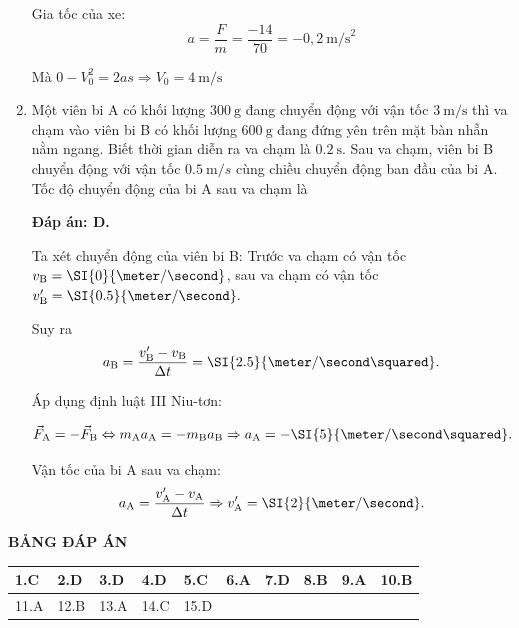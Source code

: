 \begin{enumerate}[label=\bfseries Câu \arabic*:]
{		Gia tốc của xe:
		\[a=\dfrac{F}{m}=\dfrac{-14}{70} = -0,2\ \text{m/s}^2\]
		
		Mà $0-V_0^2 = 2as \Rightarrow V_0 = 4\ \text{m/s}$
	}
	\item {}
	
	
	{Một viên bi A có khối lượng $\SI{300}{\gram}$ đang chuyển động với vận tốc $\SI{3}{\meter / \second}$ thì va chạm vào viên bi B có khối lượng $\SI{600}{\gram}$ đang đứng yên trên mặt bàn nhẵn nằm ngang. Biết thời gian diễn ra va chạm là $\SI{0.2}{\second}$. Sau va chạm, viên bi B chuyển động với vận tốc $\SI{0.5}{\meter/s}$ cùng chiều chuyển động ban đầu của bi A. Tốc độ chuyển động của bi A sau va chạm là
	}
	
	\hideall
	{	\textbf{Đáp án: D.}
		
		Ta xét chuyển động của viên bi B: Trước va chạm có vận tốc
		 $v_\text B = \SI{0}{\meter / \second}$, sau va chạm có vận tốc $v_\text B'=\SI{0.5}{\meter/ \second}.$
		
		Suy ra $$a_\text B=\dfrac{v_\text B'-v_\text B}{\Delta t}=\SI{2.5}{\meter / \second \squared}.$$
		
		Áp dụng định luật III Niu-tơn:
		
		$$\vec{F}_\text {A}=- \vec{F}_\text {B} \Leftrightarrow m_\text A a_\text A =- m_\text B a_\text B \Rightarrow a_\text A =- \SI{5}{\meter / \second \squared}.$$
		
		Vận tốc của bi A sau va chạm: $$a_\text A = \dfrac{v_\text A'-v_\text A}{\Delta t}\Rightarrow v_\text A' = \SI{2}{\meter / \second}.$$
	}
	
\end{enumerate}



\hideall
{
	\begin{center}
		\textbf{BẢNG ĐÁP ÁN}
	\end{center}
	\begin{center}
		\begin{tabular}{|m{2.8em}|m{2.8em}|m{2.8em}|m{2.8em}|m{2.8em}|m{2.8em}|m{2.8em}|m{2.8em}|m{2.8em}|m{2.8em}|}
			\hline
			1.C  & 2.D  & 3.D  & 4.D  & 5.C  & 6.A  & 7.D  & 8.B  & 9.A  & 10.B  \\
			\hline
			11.A  & 12.B  & 13.A  & 14.C  & 15.D  & &  &  &  &  \\
			\hline
			
		\end{tabular}
	\end{center}
}
